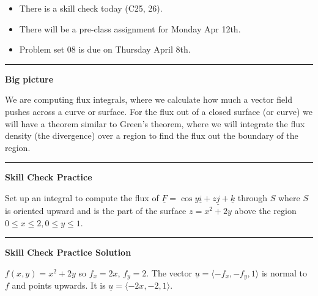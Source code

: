 \documentclass[12pt,letterpaper,noanswers]{exam}
\newcommand{\mb}[1]{\underline{#1}}
\begin{document}
 \pdfpageheight 11in 
  \pdfpagewidth 8.5in





\begin{itemize}
\itemsep0em
\item There is a skill check today (C25, 26).
\item There will be a pre-class assignment for Monday Apr 12th.
\item Problem set 08 is due on Thursday April 8th.
\end{itemize}

\hrule
\vspace{0.2cm}


\noindent\textbf{Big picture}

We are computing flux integrals, where we calculate how much a vector field pushes across a curve or surface.  For the flux out of a closed surface (or curve) we will have a theorem similar to Green's theorem, where we will integrate the flux density (the divergence) over a region to find the flux out the boundary of the region.

\vspace{0.2cm}
\hrule
\vspace{0.2cm}

\noindent\textbf{Skill Check Practice}
\begin{questions}
\item Set up an integral to compute the flux of $\mb F = \cos y\mb i + z\mb j + \mb k$ through $S$ where $S$ is oriented upward and is the part of the surface $z = x^2+2y$ above the region $0\leq x\leq 2, 0\leq y\leq 1$.
\end{questions}

\vspace{0.2cm}
\hrule
\vspace{0.2cm}

\noindent\textbf{Skill Check Practice Solution}

$f(x,y) = x^2+2y$ so $f_x = 2x$, $f_y = 2$.  The vector $\mb u = \langle -f_x, -f_y, 1\rangle$ is normal to $f$ and points upwards.  It is $\mb u = \langle -2x, -2, 1\rangle$.
\end{document}
